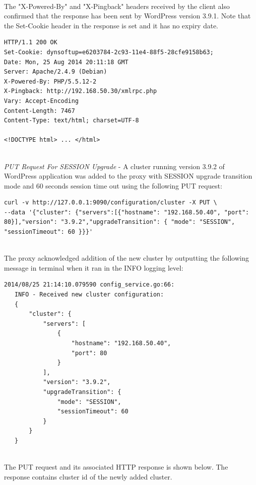 \documentclass[a4paper,11pt,twoside]{report}
\begin{document}
\noindent\\
The "X-Powered-By" and "X-Pingback" headers received by the client also confirmed that the response has been sent by WordPress version 3.9.1.  Note that the Set-Cookie header in the response is set and it has no expiry date. \smallskip 

\begin{lstlisting}[language=terminal] 
HTTP/1.1 200 OK
Set-Cookie: dynsoftup=e6203784-2c93-11e4-88f5-28cfe9158b63;
Date: Mon, 25 Aug 2014 20:11:18 GMT
Server: Apache/2.4.9 (Debian)
X-Powered-By: PHP/5.5.12-2
X-Pingback: http://192.168.50.30/xmlrpc.php
Vary: Accept-Encoding
Content-Length: 7467
Content-Type: text/html; charset=UTF-8

<!DOCTYPE html> ... </html>
\end{lstlisting} 

\noindent\\
\textit{PUT Request For SESSION Upgrade} - A cluster running version 3.9.2 of WordPress application was added to the proxy with SESSION upgrade transition mode and 60 seconds session time out using the following PUT request: \smallskip 

\begin{lstlisting}[language=terminal] 
curl -v http://127.0.0.1:9090/configuration/cluster -X PUT \
--data '{"cluster": {"servers":[{"hostname": "192.168.50.40", "port": 80}],"version": "3.9.2","upgradeTransition": { "mode": "SESSION", "sessionTimeout": 60 }}}'
\end{lstlisting}

\noindent\\
The proxy acknowledged addition of the new cluster by outputting the following message in terminal when it ran in the INFO logging level: \smallskip 

\begin{lstlisting}[language=terminal] 
2014/08/25 21:14:10.079590 config_service.go:66:     
   INFO - Received new cluster configuration:
   {
       "cluster": {
           "servers": [
               {
                   "hostname": "192.168.50.40",
                   "port": 80
               }
           ],
           "version": "3.9.2",
           "upgradeTransition": {
               "mode": "SESSION",
               "sessionTimeout": 60
           }
       }
   }
\end{lstlisting}   

\noindent\\
The PUT request and its associated HTTP response is shown below. The response contains cluster id of the newly added cluster.\smallskip 
\end{document}
